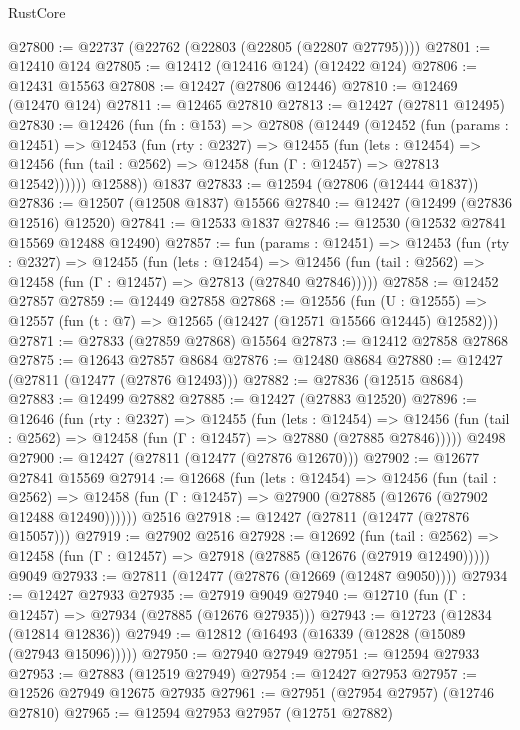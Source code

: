 \begin{lexlean}{RustCore}
\begin{coremodule}
@27800 := @22737 (@22762 (@22803 (@22805 (@22807 @27795))))
@27801 := @12410 @124
@27805 := @12412 (@12416 @124) (@12422 @124)
@27806 := @12431 @15563
@27808 := @12427 (@27806 @12446)
@27810 := @12469 (@12470 @124)
@27811 := @12465 @27810
@27813 := @12427 (@27811 @12495)
@27830 := @12426
    (fun (fn : @153) =>
    @27808
      (@12449
        (@12452
          (fun (params : @12451) =>
          @12453
            (fun (rty : @2327) =>
            @12455
              (fun (lets : @12454) =>
              @12456 (fun (tail : @2562) => @12458 (fun (Γ : @12457) => @27813 @12542))))))
        @12588))
    @1837
@27833 := @12594 (@27806 (@12444 @1837))
@27836 := @12507 (@12508 @1837) @15566
@27840 := @12427 (@12499 (@27836 @12516) @12520)
@27841 := @12533 @1837
@27846 := @12530 (@12532 @27841 @15569 @12488 @12490)
@27857 := fun (params : @12451) =>
  @12453
    (fun (rty : @2327) =>
    @12455
      (fun (lets : @12454) =>
      @12456 (fun (tail : @2562) => @12458 (fun (Γ : @12457) => @27813 (@27840 @27846)))))
@27858 := @12452 @27857
@27859 := @12449 @27858
@27868 := @12556
    (fun (U : @12555) => @12557 (fun (t : @7) => @12565 (@12427 (@12571 @15566 @12445) @12582)))
@27871 := @27833 (@27859 @27868) @15564
@27873 := @12412 @27858 @27868
@27875 := @12643 @27857 @8684
@27876 := @12480 @8684
@27880 := @12427 (@27811 (@12477 (@27876 @12493)))
@27882 := @27836 (@12515 @8684)
@27883 := @12499 @27882
@27885 := @12427 (@27883 @12520)
@27896 := @12646
    (fun (rty : @2327) =>
    @12455
      (fun (lets : @12454) =>
      @12456 (fun (tail : @2562) => @12458 (fun (Γ : @12457) => @27880 (@27885 @27846)))))
    @2498
@27900 := @12427 (@27811 (@12477 (@27876 @12670)))
@27902 := @12677 @27841 @15569
@27914 := @12668
    (fun (lets : @12454) =>
    @12456
      (fun (tail : @2562) =>
      @12458 (fun (Γ : @12457) => @27900 (@27885 (@12676 (@27902 @12488 @12490))))))
    @2516
@27918 := @12427 (@27811 (@12477 (@27876 @15057)))
@27919 := @27902 @2516
@27928 := @12692
    (fun (tail : @2562) => @12458 (fun (Γ : @12457) => @27918 (@27885 (@12676 (@27919 @12490)))))
    @9049
@27933 := @27811 (@12477 (@27876 (@12669 (@12487 @9050))))
@27934 := @12427 @27933
@27935 := @27919 @9049
@27940 := @12710 (fun (Γ : @12457) => @27934 (@27885 (@12676 @27935)))
@27943 := @12723 (@12834 (@12814 @12836))
@27949 := @12812 (@16493 (@16339 (@12828 (@15089 (@27943 @15096)))))
@27950 := @27940 @27949
@27951 := @12594 @27933
@27953 := @27883 (@12519 @27949)
@27954 := @12427 @27953
@27957 := @12526 @27949 @12675 @27935
@27961 := @27951 (@27954 @27957) (@12746 @27810)
@27965 := @12594 @27953 @27957 (@12751 @27882)

\end{coremodule}
\end{lexlean}
